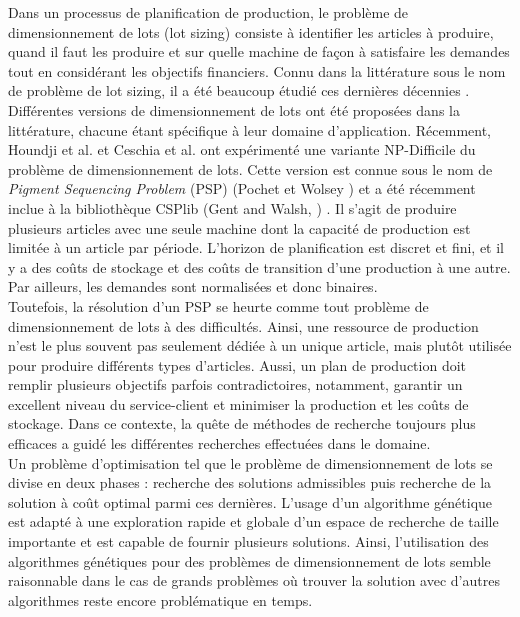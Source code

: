Dans un processus de planification de production, le problème de dimensionnement
de lots (lot sizing) consiste à identifier les articles à produire, quand il
faut les produire et sur quelle machine de façon à satisfaire les demandes
tout en considérant les objectifs financiers. Connu dans la
littérature sous le nom de problème de lot sizing, il a été beaucoup étudié
ces dernières décennies \cite{cathy}.\\
	\hspace*{.5cm} Différentes versions de dimensionnement de lots ont été proposées dans la littérature, chacune étant spécifique à leur domaine d'application. Récemment, Houndji et al. \cite{hvr_stockingCost} et Ceschia et al. \cite{opthub} ont expérimenté une variante NP-Difficile du problème de dimensionnement de lots. Cette version est connue sous le nom de \emph{Pigment Sequencing Problem} (PSP) (Pochet et Wolsey \cite{pochet_wolsey}) et a été récemment inclue à la bibliothèque CSPlib (Gent and Walsh, \cite{gent_walsh}) . Il s'agit de produire plusieurs articles avec une seule machine dont la capacité de production est limitée à un article par période. L'horizon de planification est discret et fini, et il y a des coûts de stockage et des coûts de transition d'une production à une autre. Par ailleurs, les demandes sont normalisées et donc binaires. \\
	\hspace*{.5cm} Toutefois, la résolution d'un PSP se heurte comme tout problème de dimensionnement de lots à des difficultés. Ainsi, une ressource de production n'est le plus souvent pas seulement dédiée à un unique article, mais plutôt utilisée pour produire différents types d'articles. Aussi, un plan de production doit remplir plusieurs objectifs parfois contradictoires, notamment, garantir un excellent niveau du service-client et minimiser la production et les coûts de stockage. Dans ce contexte, la quête de méthodes de recherche toujours plus efficaces a guidé les différentes recherches effectuées\cite{ratheil_master} \cite{ceschia} dans le domaine. \\
	\hspace*{.5cm} Un problème d’optimisation tel que le problème de dimensionnement de lots se divise en deux phases : recherche des solutions admissibles puis recherche de la solution à coût optimal parmi ces dernières. L’usage d’un algorithme génétique est adapté à une exploration rapide et globale d’un espace de recherche de taille importante et est capable de fournir plusieurs solutions. Ainsi, l'utilisation des algorithmes génétiques pour des problèmes de dimensionnement de lots semble raisonnable dans le cas de grands problèmes où trouver la solution avec d'autres algorithmes reste encore problématique en temps.   
	

